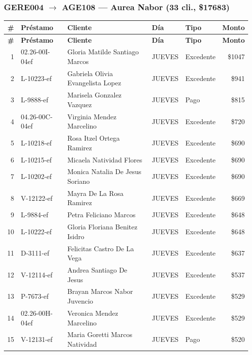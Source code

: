 \documentclass[11pt,a4paper]{article}
\newcommand{\money}[1]{\$\num{#1}}
\begin{document}
\subsubsection{GERE004 $\rightarrow$ AGE108 --- Aurea Nabor (33 cli., \money{17683})}


\begin{center}
\renewcommand{\arraystretch}{1.1}
\footnotesize
\begin{longtable}{rlp{5.5cm}llr}
\toprule
\textbf{\#} & \textbf{Pr\'estamo} & \textbf{Cliente} & \textbf{D\'ia} & \textbf{Tipo} & \textbf{Monto} \\
\midrule
\endfirsthead
\toprule
\textbf{\#} & \textbf{Pr\'estamo} & \textbf{Cliente} & \textbf{D\'ia} & \textbf{Tipo} & \textbf{Monto} \\
\midrule
\endhead
1 & 02.26-00I-04ef & Gloria Matilde Santiago Marcos & JUEVES & Excedente & \money{1047} \\
2 & L-10223-ef & Gabriela Olivia Evangelista Lopez & JUEVES & Excedente & \money{941} \\
3 & L-9888-ef & Marisela Gonzalez Vazquez & JUEVES & Pago & \money{815} \\
4 & 04.26-00C-04ef & Virginia Mendez Marcelino & JUEVES & Excedente & \money{720} \\
5 & L-10218-ef & Rosa Itzel Ortega Ramirez & JUEVES & Excedente & \money{690} \\
6 & L-10215-ef & Micaela Natividad Flores & JUEVES & Excedente & \money{690} \\
7 & L-10202-ef & Monica Natalia De Jesus Soriano & JUEVES & Excedente & \money{690} \\
8 & V-12122-ef & Mayra De La Rosa Ramirez & JUEVES & Excedente & \money{669} \\
9 & L-9884-ef & Petra Feliciano Marcos & JUEVES & Excedente & \money{648} \\
10 & L-10222-ef & Gloria Floriana Benitez Isidro & JUEVES & Excedente & \money{648} \\
11 & D-3111-ef & Felicitas Castro De La Vega & JUEVES & Excedente & \money{637} \\
12 & V-12114-ef & Andrea Santiago De Jesus & JUEVES & Excedente & \money{537} \\
13 & P-7673-ef & Brayan Marcos Nabor Juvencio & JUEVES & Excedente & \money{529} \\
14 & 02.26-00H-04ef & Veronica Mendez Marcelino & JUEVES & Excedente & \money{529} \\
15 & V-12131-ef & Maria Goretti Marcos Natividad & JUEVES & Pago & \money{520} \\

\end{longtable}
\end{center}
\end{document}
